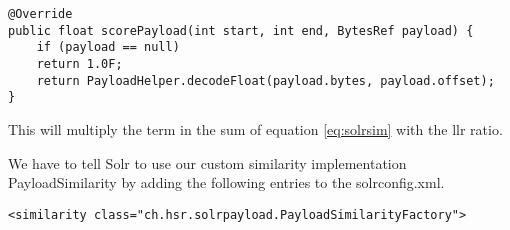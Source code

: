\begin{description}
\begin{lstlisting}
@Override
public float scorePayload(int start, int end, BytesRef payload) {
    if (payload == null)
	return 1.0F;
    return PayloadHelper.decodeFloat(payload.bytes, payload.offset);
}
\end{lstlisting}
This will multiply the term in the sum of equation \ref{eq:solrsim} with the \gls{llr} ratio.

We have to tell Solr to use our custom similarity implementation PayloadSimilarity by adding the following entries to the solrconfig.xml.
\begin{lstlisting}
<similarity class="ch.hsr.solrpayload.PayloadSimilarityFactory">
\end{lstlisting}
\end{description}
